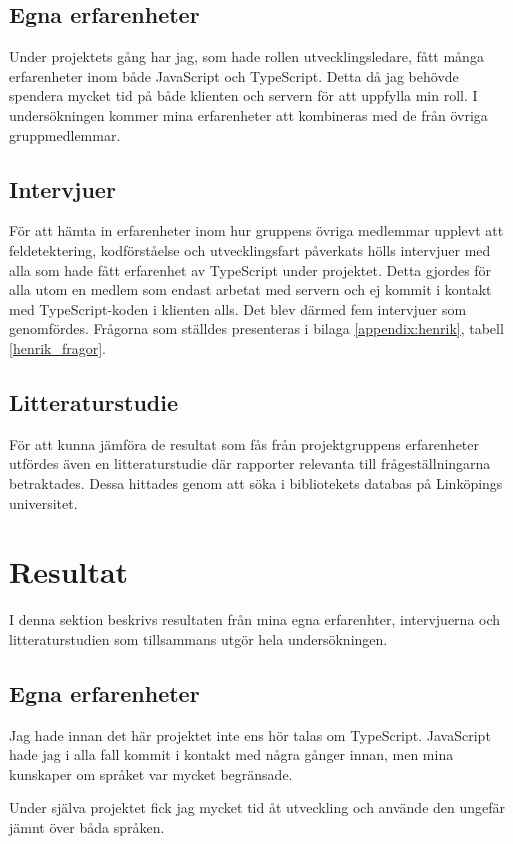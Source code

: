 \subsection{Egna erfarenheter}
Under projektets gång har jag, som hade rollen utvecklingsledare, fått många erfarenheter inom både JavaScript och TypeScript. Detta då jag behövde spendera mycket tid på både klienten och servern för att uppfylla min roll. I undersökningen kommer mina erfarenheter att kombineras med de från övriga gruppmedlemmar.

\subsection{Intervjuer}
För att hämta in erfarenheter inom hur gruppens övriga medlemmar upplevt att feldetektering, kodförståelse och utvecklingsfart påverkats hölls intervjuer med alla som hade fått erfarenhet av TypeScript under projektet. Detta gjordes för alla utom en medlem som endast arbetat med servern och ej kommit i kontakt med TypeScript-koden i klienten alls. Det blev därmed fem intervjuer som genomfördes. Frågorna som ställdes presenteras i bilaga \ref{appendix:henrik}, tabell \ref{henrik_fragor}.

\subsection{Litteraturstudie}
För att kunna jämföra de resultat som fås från projektgruppens erfarenheter utfördes även en litteraturstudie där rapporter relevanta till frågeställningarna betraktades. Dessa hittades genom att söka i bibliotekets databas på Linköpings universitet. 

\section{Resultat}
I denna sektion beskrivs resultaten från mina egna erfarenhter, intervjuerna och litteraturstudien som tillsammans utgör hela undersökningen.
\subsection{Egna erfarenheter}
Jag hade innan det här projektet inte ens hör talas om TypeScript. JavaScript hade jag i alla fall kommit i kontakt med några gånger innan, men mina kunskaper om språket var mycket begränsade.

Under själva projektet fick jag mycket tid åt utveckling och använde den ungefär jämnt över båda språken.
